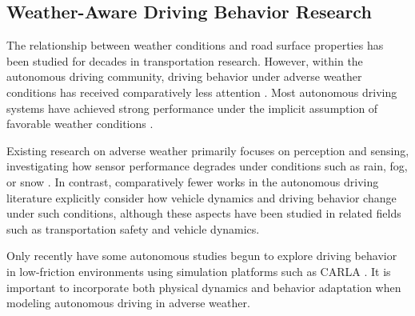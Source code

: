 
\subsection{Weather-Aware Driving Behavior Research}
The relationship between weather conditions and road surface properties has been studied for decades in transportation research. However, within the autonomous driving community, driving behavior under adverse weather conditions has received comparatively less attention \cite{gaonkar_enhancing_2025}. Most autonomous driving systems have achieved strong performance under the implicit assumption of favorable weather conditions \cite{li_autonomous_2025}. 

Existing research on adverse weather primarily focuses on perception and sensing, investigating how sensor performance degrades under conditions such as rain, fog, or snow \cite{song_weather_2020, li_autonomous_2025, fursa_worsening_2021, rahmati_edge_2025}. In contrast, comparatively fewer works in the autonomous driving literature explicitly consider how vehicle dynamics and driving behavior change under such conditions, although these aspects have been studied in related fields such as transportation safety and vehicle dynamics\cite{chen_influence_2019}\cite{ahmed_impacts_2018}\cite{peng_examining_2018}.

Only recently have some autonomous studies \cite{aghdasian_tackling_2025} begun to explore driving behavior in low-friction environments using simulation platforms such as CARLA . It is important to incorporate both physical dynamics and behavior adaptation when modeling autonomous driving in adverse weather.



